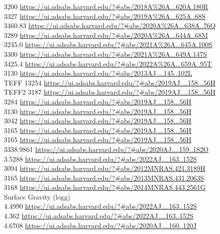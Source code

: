 3200 \url{https://ui.adsabs.harvard.edu/?#abs/2018A%26A...620A.180R}\\
3327 \url{https://ui.adsabs.harvard.edu/?#abs/2019A%26A...625A..68S}\\
3460.83 \url{https://ui.adsabs.harvard.edu/?#abs/2020A%26A...638A..76Q}\\
3289 \url{https://ui.adsabs.harvard.edu/?#abs/2020A%26A...644A..68M}\\
3245.0 \url{https://ui.adsabs.harvard.edu/?#abs/2021A%26A...645A.100S}\\
3300 \url{https://ui.adsabs.harvard.edu/?#abs/2021A%26A...649A.147S}\\
3425.4 \url{https://ui.adsabs.harvard.edu/?#abs/2022A%26A...659A..95T}\\
3130 \url{https://ui.adsabs.harvard.edu/?#abs/2013AJ....145..102L}\\
TEFF 13254 \url{https://ui.adsabs.harvard.edu/?#abs/2019AJ....158...56H}\\
TEFF2 3187 \url{https://ui.adsabs.harvard.edu/?#abs/2019AJ....158...56H}\\
3284 \url{https://ui.adsabs.harvard.edu/?#abs/2019AJ....158...56H}\\
3130 \url{https://ui.adsabs.harvard.edu/?#abs/2019AJ....158...56H}\\
3042 \url{https://ui.adsabs.harvard.edu/?#abs/2019AJ....158...56H}\\
3165 \url{https://ui.adsabs.harvard.edu/?#abs/2019AJ....158...56H}\\
3165 \url{https://ui.adsabs.harvard.edu/?#abs/2019AJ....158...56H}\\
3338.9861 \url{https://ui.adsabs.harvard.edu/?#abs/2020AJ....159..182O}\\
3.5288 \url{https://ui.adsabs.harvard.edu/?#abs/2022AJ....163..152S}\\
3094 \url{https://ui.adsabs.harvard.edu/?#abs/2012MNRAS.421.3189H}\\
3165 \url{https://ui.adsabs.harvard.edu/?#abs/2013MNRAS.431.2063S}\\
3168 \url{https://ui.adsabs.harvard.edu/?#abs/2014MNRAS.443.2561G}\\
Surface Gravity (logg)\\
4.4990 \url{https://ui.adsabs.harvard.edu/?#abs/2022AJ....163..152S}\\
4.362 \url{https://ui.adsabs.harvard.edu/?#abs/2022AJ....163..152S}\\
4.6708 \url{https://ui.adsabs.harvard.edu/?#abs/2020AJ....160..120J}\\
